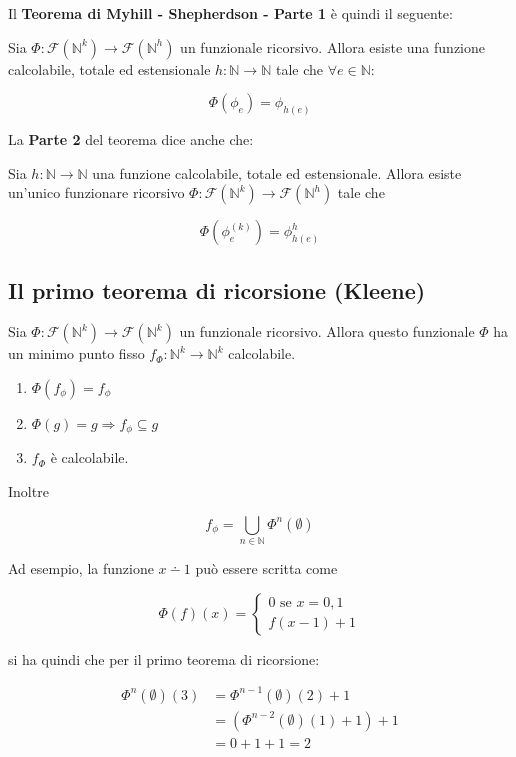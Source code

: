 Il \textbf{Teorema di Myhill - Shepherdson - Parte 1} è quindi il seguente:

Sia $\Phi : \mathcal{F}(\mathbb{N}^k) \rightarrow  \mathcal{F}(\mathbb{N}^h) $ un funzionale ricorsivo. Allora esiste una funzione calcolabile, totale ed estensionale $h : \mathbb{N} \rightarrow \mathbb{N}$ tale che $\forall e \in \mathbb{N}$:

$$
\Phi(\phi_e) = \phi_{h(e)}
$$

La \textbf{Parte 2} del teorema dice anche che:

Sia $h : \mathbb{N} \rightarrow \mathbb{N}$ una funzione calcolabile, totale ed estensionale. Allora esiste un'unico funzionare ricorsivo $\Phi : \mathcal{F}(\mathbb{N}^k) \rightarrow  \mathcal{F}(\mathbb{N}^h) $ tale che

$$
\Phi(\phi_{e}^{(k)}) = \phi_{h(e)}^{h}
$$

\subsection{Il primo teorema di ricorsione (Kleene)}

Sia $\Phi : \mathcal{F}(\mathbb{N}^k) \rightarrow  \mathcal{F}(\mathbb{N}^k) $ un funzionale ricorsivo. 
Allora questo funzionale $\Phi$ ha un minimo punto fisso $f_\Phi : \mathbb{N}^k \rightarrow \mathbb{N}^k$ calcolabile.

\begin{enumerate}
	\item $\Phi(f_\phi) = f_\phi$
	\item $\Phi(g) = g \Rightarrow f_\phi \subseteq g$
	\item $f_\Phi$ è calcolabile.
\end{enumerate}

Inoltre

$$
f_\phi = \bigcup\limits_{n \in \mathbb{N}} \Phi^{n}(\emptyset)
$$

Ad esempio, la funzione $x \dotminus 1$ può essere scritta come 

$$
\Phi(f)(x) = \begin{cases}
0 \text{ se } x = 0,1 \\
f(x-1) +1
\end{cases}
$$

si ha quindi che per il primo teorema di ricorsione:

\begin{align*}
	\Phi^n(\emptyset)(3) &= \Phi^{n-1}(\emptyset)(2) +1 \\
								     &= (\Phi^{n-2}(\emptyset)(1) + 1) +1 \\
								     &= 0 + 1 +1 = 2
\end{align*}

